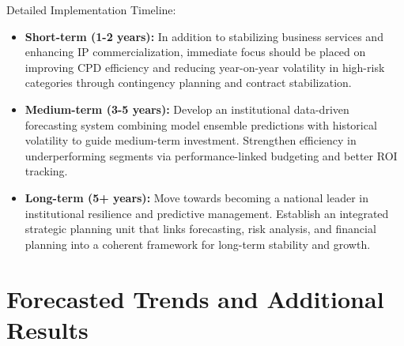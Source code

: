 \documentclass[journal,onecolumn, 10pt,draftclsnofoot]{IEEEtran}
\begin{document}
Detailed Implementation Timeline:

\begin{itemize}
    \item \textbf{Short-term (1-2 years):} In addition to stabilizing business services and enhancing IP commercialization, immediate focus should be placed on improving CPD efficiency and reducing year-on-year volatility in high-risk categories through contingency planning and contract stabilization.
    
    \item \textbf{Medium-term (3-5 years):} Develop an institutional data-driven forecasting system combining model ensemble predictions with historical volatility to guide medium-term investment. Strengthen efficiency in underperforming segments via performance-linked budgeting and better ROI tracking.
    
    \item \textbf{Long-term (5+ years):} Move towards becoming a national leader in institutional resilience and predictive management. Establish an integrated strategic planning unit that links forecasting, risk analysis, and financial planning into a coherent framework for long-term stability and growth.
\end{itemize}

\appendix
\section{Forecasted Trends and Additional Results}
\end{document}
